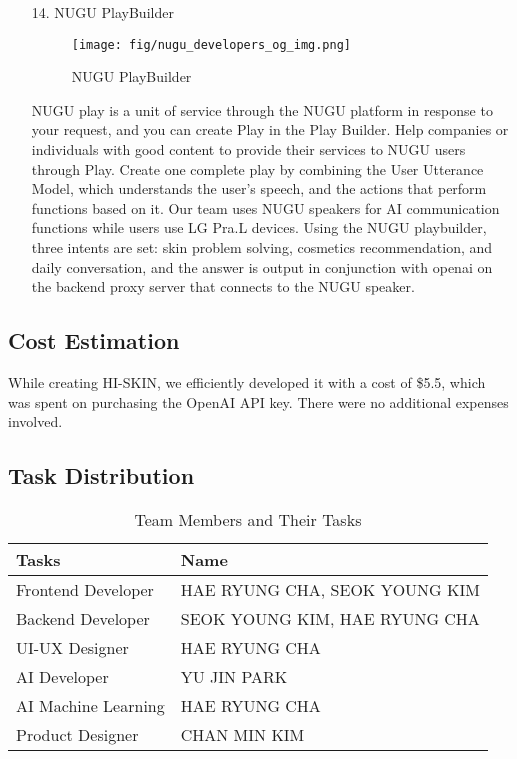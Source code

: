 \documentclass[conference]{IEEEtran}
\begin{document}
\begin{enumerate}
    \item[14.]NUGU PlayBuilder
    \begin{figure}[h]
    \centering
    \texttt{[image: fig/nugu\_developers\_og\_img.png]}
    \label{fig:NUGU PlayBuilder}
    \caption{NUGU PlayBuilder} 
    \end{figure}
    \item[]NUGU play is a unit of service through the NUGU platform in response to your request, and you can create Play in the Play Builder. Help companies or individuals with good content to provide their services to NUGU users through Play. Create one complete play by combining the User Utterance Model, which understands the user's speech, and the actions that perform functions based on it. Our team uses NUGU speakers for AI communication functions while users use LG Pra.L devices. Using the NUGU playbuilder, three intents are set: skin problem solving, cosmetics recommendation, and daily conversation, and the answer is output in conjunction with openai on the backend proxy server that connects to the NUGU speaker.

\end{enumerate}

\subsection{Cost Estimation}
While creating HI-SKIN, we efficiently developed it with a cost of \$5.5, which was spent on purchasing the OpenAI API key. There were no additional expenses involved.\\ 

\subsection{Task Distribution}

\begin{table}[h]
\centering
\caption{Team Members and Their Tasks}
\renewcommand{\arraystretch}{1.5}
\begin{tabular}{| p{3cm}|p{3cm}|}

\hline
Tasks & Name \\

\hline
Frontend Developer & HAE RYUNG CHA, SEOK YOUNG KIM\\

\hline
Backend Developer & SEOK YOUNG KIM, HAE RYUNG CHA\\

\hline
UI-UX Designer & HAE RYUNG CHA\\

\hline
AI Developer & YU JIN PARK\\

\hline
AI Machine Learning & HAE RYUNG CHA\\

\hline
Product Designer & CHAN MIN KIM\\ 

\hline
\end{tabular}
\end{table}
\clearpage
\end{document}
